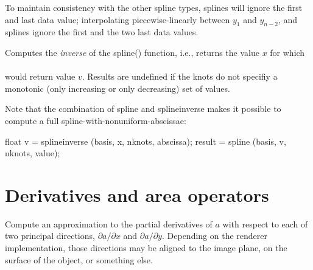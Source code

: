 \documentclass[11pt,letterpaper]{book}
\begin{document}
To maintain consistency with the other spline types,  splines will
ignore the first and last data value; interpolating piecewise-linearly
between $y_1$ and $y_{n-2}$, and  splines ignore the first
and the two last data values.
\apiend


Computes the \emph{inverse} of the {\cf spline()} function, i.e., returns
the value $x$ for which \\
   \\ 
would return value
$v$.  Results are undefined if the knots do not specifiy a monotonic
(only increasing or only decreasing) set of values.

Note that the combination of {\cf spline} and {\cf splineinverse} makes
it possible to compute a full spline-with-nonuniform-abscissae:
\begin{smallcode}
    float v = splineinverse (basis, x, nknots, abscissa);
    result = spline (basis, v, nknots, value);
\end{smallcode}
\apiend


\newpage
\section{Derivatives and area operators}
\label{sec:stdlib:derivs}

 
Compute an approximation to the partial derivatives of $a$ with respect to
each of two principal directions, $\partial a / \partial x$ and
$\partial a / \partial y$.  Depending on the renderer
implementation, those directions may be aligned to the image plane,
on the surface of the object, or something else.
\end{document}
